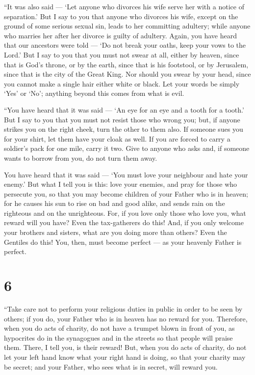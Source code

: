  ``It was also said --- `Let anyone who divorces his wife
serve her with a notice of separation.'  But I say to you
that anyone who divorces his wife, except on the ground of some serious
sexual sin, leads to her committing adultery; while anyone who marries
her after her divorce is guilty of adultery.  Again, you
have heard that our ancestors were told --- `Do not break your oaths,
keep your vows to the Lord.'  But I say to you that you
must not swear at all, either by heaven, since that is God's throne,
 or by the earth, since that is his footstool, or by
Jerusalem, since that is the city of the Great King.  Nor
should you swear by your head, since you cannot make a single hair
either white or black.  Let your words be simply `Yes' or
`No'; anything beyond this comes from what is evil.

 ``You have heard that it was said --- `An eye for an eye
and a tooth for a tooth.'  But I say to you that you must
not resist those who wrong you; but, if anyone strikes you on the right
cheek, turn the other to them also.  If someone sues you
for your shirt, let them have your cloak as well.  If you
are forced to carry a soldier's pack for one mile, carry it two.
 Give to anyone who asks and, if someone wants to borrow
from you, do not turn them away.

 You have heard that it was said --- `You must love your
neighbour and hate your enemy.'  But what I tell you is
this: love your enemies, and pray for those who persecute you,
 so that you may become children of your Father who is in
heaven; for he causes his sun to rise on bad and good alike, and sends
rain on the righteous and on the unrighteous.  For, if you
love only those who love you, what reward will you have? Even the
tax-gatherers do this!  And, if you only welcome your
brothers and sisters, what are you doing more than others? Even the
Gentiles do this!  You, then, must become perfect --- as
your heavenly Father is perfect.

\hypertarget{section-5}{%
\section{6}\label{section-5}}

 ``Take care not to perform your religious duties in public
in order to be seen by others; if you do, your Father who is in heaven
has no reward for you.  Therefore, when you do acts of
charity, do not have a trumpet blown in front of you, as hypocrites do
in the synagogues and in the streets so that people will praise them.
There, I tell you, is their reward!  But, when you do acts
of charity, do not let your left hand know what your right hand is
doing,  so that your charity may be secret; and your Father,
who sees what is in secret, will reward you.

